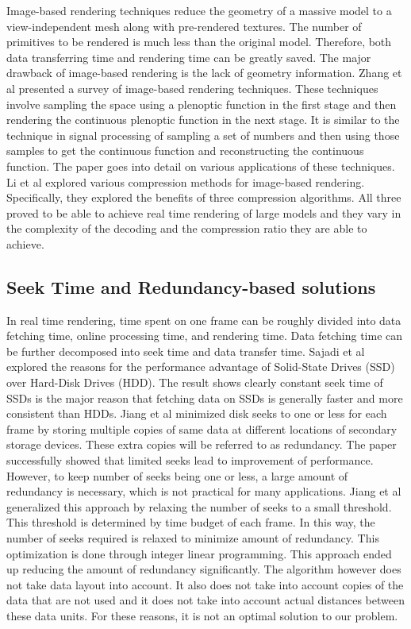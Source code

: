 \documentclass[conference]{acmsiggraph}
\begin{document}
Image-based rendering techniques reduce the geometry of a massive model to a view-independent mesh along with pre-rendered textures. The number of primitives to be rendered is much less than the original model. Therefore, both data transferring time and rendering time can be greatly saved. The major drawback of image-based rendering is the lack of geometry information. Zhang et al \cite{imagebasedrendering} presented a survey of image-based rendering techniques. These techniques involve sampling the space using a plenoptic function in the first stage and then rendering the continuous plenoptic function in the next stage. It is similar to the technique in signal processing of sampling a set of numbers and then using those samples to get the continuous function and reconstructing the continuous function. The paper goes into detail on various applications of these techniques. Li et al \cite{compressionimagebased} explored various compression methods for image-based rendering. Specifically, they explored the benefits of three compression algorithms. All three proved to be able to achieve real time rendering of large models and they vary in the complexity of the decoding and the compression ratio they are able to achieve. 

\subsection{Seek Time and Redundancy-based solutions}

In real time rendering, time spent on one frame can be roughly divided into data fetching time, online processing time, and rendering time. Data fetching time can be further decomposed into seek time and data transfer time. Sajadi et al \cite{ssdpaper} explored the reasons for the performance advantage of Solid-State Drives (SSD) over Hard-Disk Drives (HDD). The result shows clearly constant seek time of SSDs is the major reason that fetching data on SSDs is generally faster and more consistent than HDDs. Jiang et al \cite{singleseeklayout} minimized disk seeks to one or less for each frame by storing multiple copies of same data at different locations of secondary storage devices. These extra copies will be referred to as redundancy. The paper successfully showed that limited seeks lead to improvement of performance. However, to keep number of seeks being one or less, a large amount of redundancy is necessary, which is not practical for many applications. Jiang et al \cite{optimizingredundancy} generalized this approach by relaxing the number of seeks to a small threshold. This threshold is determined by time budget of each frame. In this way, the number of seeks required is relaxed to minimize amount of redundancy. This optimization is done through integer linear programming. This approach ended up reducing the amount of redundancy significantly. The algorithm however does not take data layout into account. It also does not take into account copies of the data that are not used and it does not take into account actual distances between these data units. For these reasons, it is not an optimal solution to our problem. 
\end{document}
